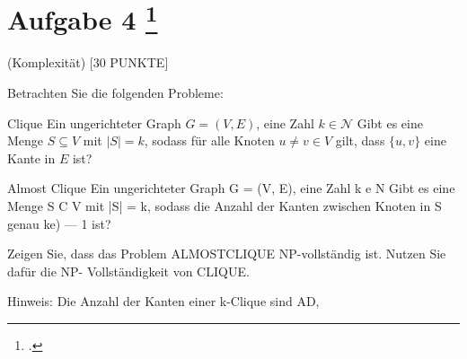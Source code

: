 \documentclass{lehramt-informatik-aufgabe}
\begin{document}
\section{Aufgabe 4
\footcite{66115:2021:03}}

 (Komplexität) [30 PUNKTE]

Betrachten Sie die folgenden Probleme:

\liProblemBeschreibung
{Clique}
{Ein ungerichteter Graph $G = (V, E)$, eine Zahl $k \in \mathcal{N}$}
{Gibt es eine Menge $S \subseteq V$ mit $|S| = k$, sodass für alle Knoten $u \neq v \in V$ gilt,
dass $\{ u, v \}$ eine Kante in $E$ ist?}

\liProblemBeschreibung
{Almost Clique}
{Ein ungerichteter Graph G = (V, E), eine Zahl k e N}
{Gibt es eine Menge S C V mit |S| = k, sodass die Anzahl der Kanten zwischen
Knoten in S genau ke) — 1 ist?}

Zeigen Sie, dass das Problem ALMOSTCLIQUE NP-vollständig ist. Nutzen Sie
dafür die NP- Vollständigkeit von CLIQUE.

Hinweis: Die Anzahl der Kanten einer k-Clique sind AD,
\end{document}
